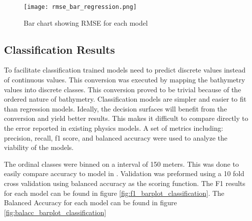 \begin{figure}[h]
    \centering
    \texttt{[image: rmse\_bar\_regression.png]} 
    \caption{Bar chart showing RMSE for each model}
    \label{fig:rmse_barplot_regression}
\end{figure}


\subsection{Classification Results}
\setlength{\parindent}{10ex}
To facilitate classification trained models need to predict discrete values instead of continuous values.
This conversion was executed by mapping the bathymetry values into discrete classes.
This conversion proved to be trivial because of the ordered nature of bathymetry.
Classification models are simpler and easier to fit than regression models.
Ideally, the decision surfaces will benefit from the conversion and yield better results.
This makes it difficult to compare directly to the error reported in existing physics models.
A set of metrics including: precision, recall, f1 score, and balanced accuracy were used to analyze the viability of the models.

\par
The ordinal classes were binned on a interval of 150 meters.
This was done to easily compare accuracy to model in \cite{jena2012prediction}.
Validation was preformed using a 10 fold cross validation using balanced accuracy as the scoring function.
The F1 results for each model can be found in figure \ref{fig:f1_barplot_classification}.
The Balanced Accuracy for each model can be found in figure \ref{fig:balacc_barplot_classification}


